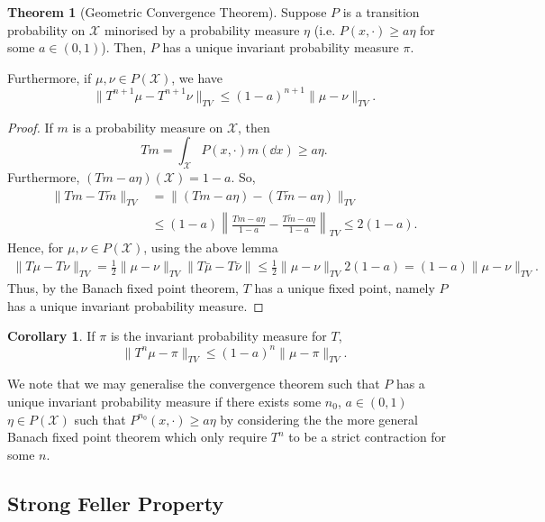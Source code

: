 \documentclass[]{article}
\theoremstyle{definition}
\newtheorem{theorem}{Theorem}
\newtheorem{corollary}{Corollary}[theorem]
\theoremstyle{definition}
\begin{document}
\begin{theorem}[Geometric Convergence Theorem]
  Suppose \(P\) is a transition probability on \(\mathcal{X}\) minorised by a 
  probability measure \(\eta\) (i.e. \(P(x, \cdot) \ge a\eta\) for some \(a \in (0, 1)\)).
  Then, \(P\) has a unique invariant probability measure \(\pi\).  

  Furthermore, if \(\mu, \nu \in P(\mathcal{X})\), we have 
  \[\|T^{n + 1}\mu - T^{n + 1}\nu\|_{TV} \le (1 - a)^{n + 1} \|\mu - \nu\|_{TV}.\]
\end{theorem}
\begin{proof}
  If \(m\) is a probability measure on \(\mathcal{X}\), then 
  \[Tm = \int_{\mathcal{X}} P(x, \cdot) m(\dd x) \ge a \eta.\]
  Furthermore, \((Tm - a \eta)(\mathcal{X}) = 1 - a\). So, 
  \[\begin{split}
    \|Tm - T\tilde m\|_{TV} & = \|(Tm - a \eta) - (T\tilde m - a \eta)\|_{TV}\\
    & \le (1 - a) \left\|\frac{Tm - a \eta}{1 - a} - \frac{T\tilde m - a \eta}{1 - a}\right\|_{TV} 
      \le 2(1 - a).
  \end{split}\]
  Hence, for \(\mu, \nu \in P(\mathcal{X})\), using the above lemma
  \[\begin{split}
    \|T\mu - T\nu\|_{TV} = \frac{1}{2}\|\mu - \nu\|_{TV} \|T\bar \mu - T \bar \nu\| 
    \le \frac{1}{2}\|\mu - \nu\|_{TV} 2 (1 - a) = (1 - a)\|\mu - \nu\|_{TV}.
  \end{split}\]
  Thus, by the Banach fixed point theorem, \(T\) has a unique fixed point, 
  namely \(P\) has a unique invariant probability measure.
\end{proof}

\begin{corollary}
  If \(\pi\) is the invariant probability measure for \(T\), 
  \[\|T^n \mu - \pi\|_{TV} \le (1 - a)^n\|\mu - \pi\|_{TV}.\]
\end{corollary}

We note that we may generalise the convergence theorem such that \(P\) has 
a unique invariant probability measure if there exists some \(n_0\), \(a \in (0, 1)\) 
\(\eta \in P(\mathcal{X})\) such that \(P^{n_0}(x, \cdot) \ge a \eta\) by considering 
the the more general Banach fixed point theorem which only require \(T^n\) to be 
a strict contraction for some \(n\).

\subsection{Strong Feller Property}
\end{document}
